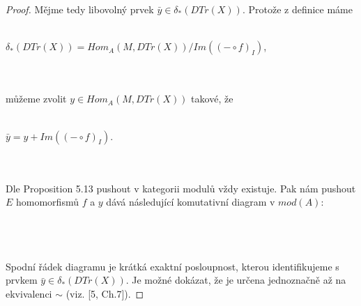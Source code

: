 \begin{proof}
          Mějme tedy libovolný prvek $\bar{y}\in\delta_*(DTr(X))$. Protože z definice 
          máme \\\\
          \centerline{$\delta_*(DTr(X))=Hom_A(M,DTr(X))/Im((-\circ f )_I)$,} \\\\
          můžeme zvolit $y\in Hom_A(M,DTr(X))$ takové, že \\\\
          \centerline{$\bar{y}=y+Im((-\circ f )_I)$.} \\\\
          Dle \cite{5} Proposition 5.13 pushout v kategorii modulů vždy existuje. 
          Pak nám pushout $E$ homomorfismů $f$ a $y$ dává následující komutativní diagram v 
          $mod(A)$:  \\\\
          \centerline{}\\\\
          Spodní řádek diagramu je krátká exaktní posloupnost, kterou 
          identifikujeme s prvkem $\bar{y}\in\delta_*(DTr(X))$. Je možné dokázat, 
          že je určena jednoznačně až na ekvivalenci $\sim$ (viz. [5, Ch.7]).
         

\end{proof}

